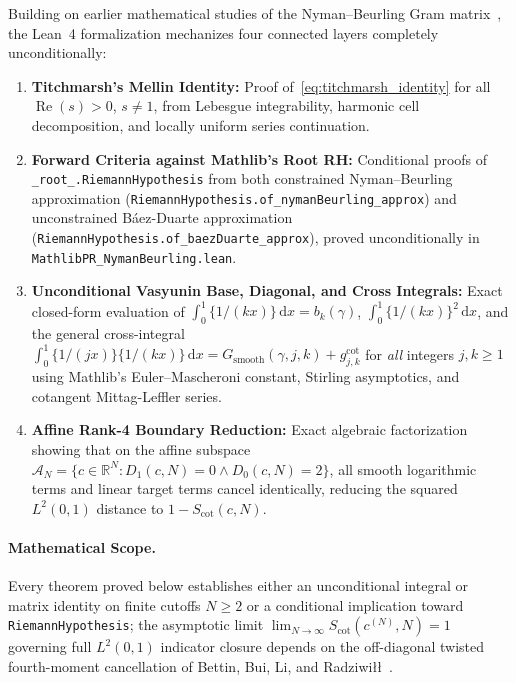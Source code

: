 \documentclass[11pt,a4paper]{article}
\theoremstyle{definition}
\newcommand{\dee}{\mathrm{d}}
\newcommand{\Rset}{\mathbb{R}}
\begin{document}
Building on earlier mathematical studies of the Nyman--Beurling Gram matrix~\cite{Burnol2002,Vasyunin1995,BettinBrowning2014}, the Lean~4 formalization mechanizes four connected layers completely unconditionally:
\begin{enumerate}[label=(\roman*),noitemsep]
  \item \textbf{Titchmarsh's Mellin Identity:} Proof of~\eqref{eq:titchmarsh_identity} for all $\operatorname{Re}(s) > 0$, $s \neq 1$, from Lebesgue integrability, harmonic cell decomposition, and locally uniform series continuation.
  \item \textbf{Forward Criteria against Mathlib's Root RH:} Conditional proofs of \texttt{\_root\_.\allowbreak Riemann\allowbreak Hypothesis} from both constrained Nyman--Beurling approximation (\texttt{Riemann\allowbreak Hypothesis.\allowbreak of\_\allowbreak nyman\allowbreak Beurling\_\allowbreak approx}) and unconstrained B\'aez-Duarte approximation (\texttt{Riemann\allowbreak Hypothesis.\allowbreak of\_\allowbreak baez\allowbreak Duarte\_\allowbreak approx}), proved unconditionally in \texttt{MathlibPR\_\allowbreak Nyman\allowbreak Beurling.lean}.
  \item \textbf{Unconditional Vasyunin Base, Diagonal, and Cross Integrals:} Exact closed-form evaluation of $\int_0^1 \{1/(kx)\}\,\dee x = b_k(\gamma)$, $\int_0^1 \{1/(kx)\}^2\,\dee x$, and the general cross-integral $\int_0^1 \{1/(jx)\}\{1/(kx)\}\,\dee x = G_{\mathrm{smooth}}(\gamma, j, k) + g_{j,k}^{\mathrm{cot}}$ for \emph{all} integers $j, k \ge 1$ using Mathlib's Euler--Mascheroni constant, Stirling asymptotics, and cotangent Mittag-Leffler series.
  \item \textbf{Affine Rank-4 Boundary Reduction:} Exact algebraic factorization showing that on the affine subspace $\mathcal{A}_N = \{c \in \Rset^N : D_1(c, N) = 0 \land D_0(c, N) = 2\}$, all smooth logarithmic terms and linear target terms cancel identically, reducing the squared $L^2(0, 1)$ distance to $1 - S_{\mathrm{cot}}(c, N)$.
\end{enumerate}

\paragraph{Mathematical Scope.}
Every theorem proved below establishes either an unconditional integral or matrix identity on finite cutoffs $N \ge 2$ or a conditional implication toward \texttt{RiemannHypothesis}; the asymptotic limit $\lim_{N \to \infty} S_{\mathrm{cot}}(c^{(N)}, N) = 1$ governing full $L^2(0,1)$ indicator closure depends on the off-diagonal twisted fourth-moment cancellation of Bettin, Bui, Li, and Radziwi{\l}{\l}~\cite{BettinBrowning2014}.
\end{document}
